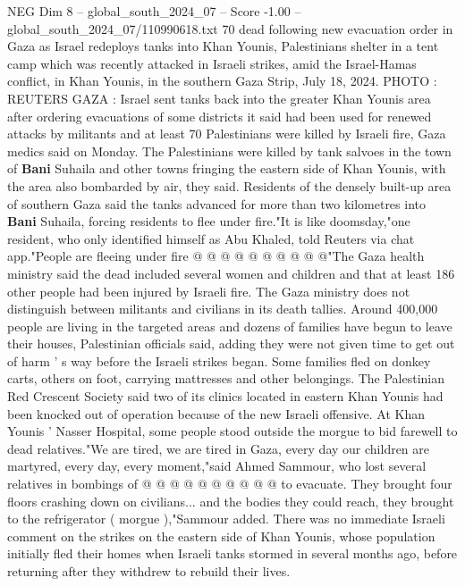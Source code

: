 \begin{textsample}{NEG Dim 8 – global\_south\_2024\_07 – Score -1.00 – global\_south\_2024\_07/110990618.txt}  \label{ex:f8_neg_350}
70 dead following new evacuation order in Gaza as Israel redeploys tanks into Khan Younis, Palestinians shelter in a tent camp which was recently attacked in Israeli strikes, amid the Israel-Hamas conflict, in Khan Younis, in the southern Gaza Strip, July 18, 2024.
PHOTO : REUTERS GAZA : Israel sent tanks back into the greater Khan Younis area after ordering evacuations of some districts it said had been used for renewed attacks by militants and at least 70 Palestinians were killed by Israeli fire, Gaza medics said on Monday.
The Palestinians were killed by tank salvoes in the town of \textbf{Bani} Suhaila and other towns fringing the eastern side of Khan Younis, with the area also bombarded by air, they said.
Residents of the densely built-up area of southern Gaza said the tanks advanced for more than two kilometres into \textbf{Bani} Suhaila, forcing residents to flee under fire."It is like doomsday,"one resident, who only identified himself as Abu Khaled, told Reuters via chat app."People are fleeing under fire @ @ @ @ @ @ @ @ @ @"The Gaza health ministry said the dead included several women and children and that at least 186 other people had been injured by Israeli fire.
The Gaza ministry does not distinguish between militants and civilians in its death tallies.
Around 400,000 people are living in the targeted areas and dozens of families have begun to leave their houses, Palestinian officials said, adding they were not given time to get out of harm ' s way before the Israeli strikes began.
Some families fled on donkey carts, others on foot, carrying mattresses and other belongings.
The Palestinian Red Crescent Society said two of its clinics located in eastern Khan Younis had been knocked out of operation because of the new Israeli offensive.
At Khan Younis ' Nasser Hospital, some people stood outside the morgue to bid farewell to dead relatives."We are tired, we are tired in Gaza, every day our children are martyred, every day, every moment,"said Ahmed Sammour, who lost several relatives in bombings of @ @ @ @ @ @ @ @ @ @ to evacuate.
They brought four floors crashing down on civilians... and the bodies they could reach, they brought to the refrigerator ( morgue ),"Sammour added.
There was no immediate Israeli comment on the strikes on the eastern side of Khan Younis, whose population initially fled their homes when Israeli tanks stormed in several months ago, before returning after they withdrew to rebuild their lives.

\end{textsample}
